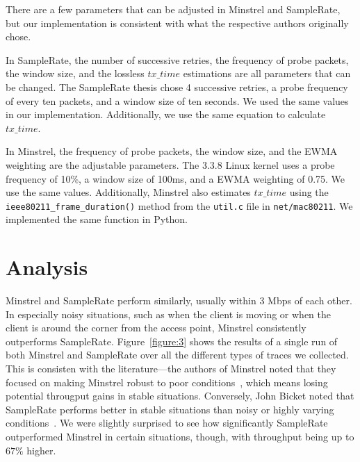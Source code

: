 \documentclass[twocolumn,10pt]{article}
\begin{document}
There are a few parameters that can be adjusted in Minstrel and
SampleRate, but our implementation is consistent with what the
respective authors originally chose.

In SampleRate, the number of successive retries, the frequency of
probe packets, the window size, and the lossless $tx\_time$
estimations are all parameters that can be changed.  The SampleRate
thesis chose 4 successive retries, a probe frequency of every ten
packets, and a window size of ten seconds.  We used the same values in
our implementation.  Additionally, we use the same equation to
calculate $tx\_time$.

In Minstrel, the frequency of probe packets, the window size, and the
EWMA weighting are the adjustable parameters.  The 3.3.8 Linux kernel
uses a probe frequency of 10\%, a window size of 100ms, and a EWMA
weighting of 0.75.  We use the same values.  Additionally, Minstrel
also estimates $tx\_time$ using the \verb|ieee80211_frame_duration()|
method from the \texttt{util.c} file in \texttt{net/mac80211}.  We
implemented the same function in Python.


\section{Analysis} \label{sec:analysis}

Minstrel and SampleRate perform similarly, usually within 3 Mbps of
each other.  In especially noisy situations, such as when the client
is moving or when the client is around the corner from the access
point, Minstrel consistently outperforms SampleRate.
Figure~\ref{figure:3} shows the results of a single run of both
Minstrel and SampleRate over all the different types of traces we
collected.  This is consisten with the literature---the authors of
Minstrel noted that they focused on making Minstrel robust to poor
conditions~\cite{minstrel}, which means losing potential througput
gains in stable situations.  Conversely, John Bicket noted that
SampleRate performs better in stable situations than noisy or highly
varying conditions~\cite{samplerate}.  We were slightly surprised to
see how significantly SampleRate outperformed Minstrel in certain
situations, though, with throughput being up to $67\%$ higher.
\end{document}
